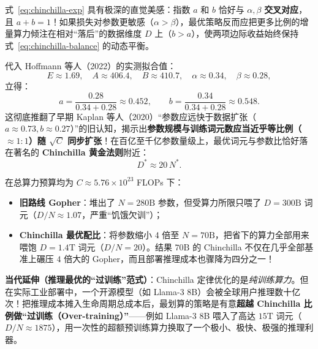 式~\eqref{eq:chinchilla-exp} 具有极深的直觉美感：指数 $a$ 和 $b$ 恰好与 $\alpha, \beta$ \textbf{交叉对应}，且 $a + b = 1$！如果损失对参数更敏感（$\alpha > \beta$），最优策略反而应把更多比例的增量算力倾注在相对“落后”的数据维度 $D$ 上（$b > a$），使两项边际收益始终保持式~\eqref{eq:chinchilla-balance} 的动态平衡。

代入 Hoffmann 等人（2022）的实测拟合值：
\[
  E \approx 1.69, \quad A \approx 406.4, \quad B \approx 410.7, \quad \alpha \approx 0.34, \quad \beta \approx 0.28,
\]
立得：
\[
  a = \frac{0.28}{0.34 + 0.28} \approx 0.452, \qquad
  b = \frac{0.34}{0.34 + 0.28} \approx 0.548.
\]
这彻底推翻了早期 Kaplan 等人（2020）“参数应远快于数据扩张（$a \approx 0.73, b \approx 0.27$）”的旧认知，揭示出\textbf{参数规模与训练词元数应当近乎等比例（$\approx 1:1$）随 $\sqrt{C}$ 同步扩张}！在百亿至千亿参数量级上，最优词元与参数比恰好落在著名的 \textbf{Chinchilla 黄金法则}附近：
\[
  D^* \approx 20\, N^*.
\]

\begin{example}
在总算力预算均为 $C \approx 5.76 \times 10^{23}$ FLOPs 下：
\begin{itemize}
  \item \textbf{旧路线 Gopher}：堆出了 $N = 280\text{B}$ 参数，但受算力所限只喂了 $D = 300\text{B}$ 词元（$D/N \approx 1.07$，严重“饥饿欠训”）；
  \item \textbf{Chinchilla 最优配比}：将参数缩小 4 倍至 $N = 70\text{B}$，把省下的算力全部用来喂饱 $D = 1.4\text{T}$ 词元（$D/N = 20$）。结果 $70\text{B}$ 的 Chinchilla 不仅在几乎全部基准上碾压 $4$ 倍大的 Gopher，而且部署推理成本也骤降为四分之一！
\end{itemize}
\textbf{当代延伸（推理最优的“过训练”范式）}：Chinchilla 定律优化的是\emph{纯训练算力}。但在实际工业部署中，一个开源模型（如 Llama-3 8B）会被全球用户推理数十亿次！把推理成本摊入生命周期总成本后，最划算的策略是有意\textbf{超越 Chinchilla 比例做“过训练（Over-training）”}——例如 Llama-3 8B 喂入了高达 $15\text{T}$ 词元（$D/N \approx 1875$），用一次性的超额预训练算力换取了一个极小、极快、极强的推理利器。
\end{example}

